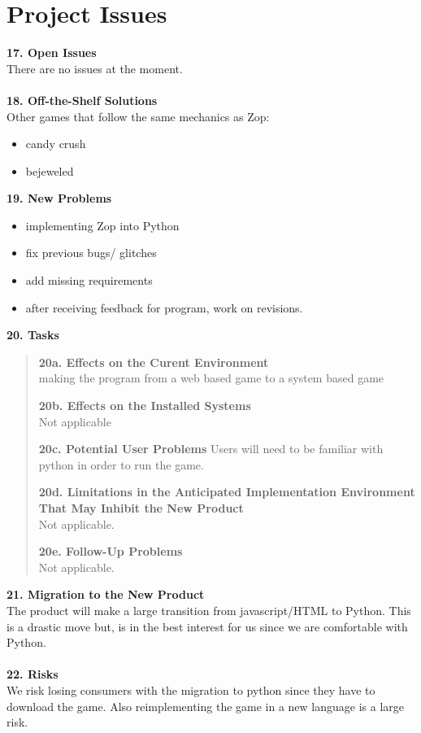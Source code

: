 \documentclass[12pt]{article}
\begin{document}
\section*{Project Issues}

\textbf{17. Open Issues}\\
There are no issues at the moment.\\\\
\textbf{18. Off-the-Shelf Solutions}\\
 Other games that follow the same mechanics as Zop:
 \begin{itemize}
  \item candy crush
  \item bejeweled
 \end{itemize}
\textbf{19. New Problems}\\
\begin{itemize}
 \item implementing Zop into Python
 \item fix previous bugs/ glitches
 \item add missing requirements
 \item after receiving feedback for program, work on revisions.
\end{itemize}
\textbf{20. Tasks}
\begin{quote}
 \textbf{20a. Effects on the Curent Environment}\\
 making the program from a web based game to a system based game
 
 \textbf{20b. Effects on the Installed Systems}\\
 Not applicable
 
 \textbf{20c. Potential User Problems}
 Users will need to be familiar with python in order to run the game.
 
 \textbf{20d. Limitations in the Anticipated Implementation Environment That May
Inhibit the New Product}\\
Not applicable.
 
\textbf{20e. Follow-Up Problems}\\
Not applicable.
\end{quote}
\textbf{21. Migration to the New Product}\\
The product will make a large transition from javascript/HTML to Python.  This is a drastic move but, is in the best interest for us since we are comfortable with Python.\\\\
\textbf{22. Risks}\\
We risk losing consumers with the migration to python since they have to download the game. Also reimplementing the game in a new language is a large risk.\\\\
\end{document}
